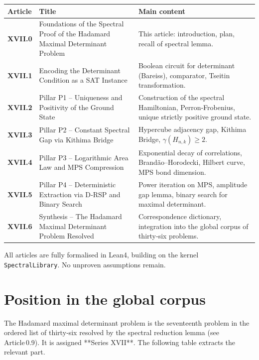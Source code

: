 \documentclass[11pt,a4paper]{article}
\begin{document}
\begin{center}
\small
\begin{tabular}{@{}>{\bfseries}l>{\raggedright\arraybackslash}p{4.5cm}>{\raggedright\arraybackslash}p{6cm}@{}}
\toprule
\textbf{Article} & \textbf{Title} & \textbf{Main content} \\
\midrule
XVII.0 & Foundations of the Spectral Proof of the Hadamard Maximal Determinant Problem & This article: introduction, plan, recall of spectral lemma. \\
XVII.1 & Encoding the Determinant Condition as a SAT Instance & Boolean circuit for determinant (Bareiss), comparator, Tseitin transformation. \\
XVII.2 & Pillar P1 – Uniqueness and Positivity of the Ground State & Construction of the spectral Hamiltonian, Perron‑Frobenius, unique strictly positive ground state. \\
XVII.3 & Pillar P2 – Constant Spectral Gap via Kithima Bridge & Hypercube adjacency gap, Kithima Bridge, $\gamma(H_{n,k})\ge2$. \\
XVII.4 & Pillar P3 – Logarithmic Area Law and MPS Compression & Exponential decay of correlations, Brandão–Horodecki, Hilbert curve, MPS bond dimension. \\
XVII.5 & Pillar P4 – Deterministic Extraction via D‑RSP and Binary Search & Power iteration on MPS, amplitude gap lemma, binary search for maximal determinant. \\
XVII.6 & Synthesis – The Hadamard Maximal Determinant Problem Resolved & Correspondence dictionary, integration into the global corpus of thirty‑six problems. \\
\bottomrule
\end{tabular}
\normalsize
\end{center}

All articles are fully formalised in Lean4, building on the kernel \texttt{SpectralLibrary}. No unproven assumptions remain.

\section{Position in the global corpus}

The Hadamard maximal determinant problem is the seventeenth problem in the ordered list of thirty‑six resolved by the spectral reduction lemma (see Article 0.9). It is assigned **Series XVII**. The following table extracts the relevant part.
\end{document}
